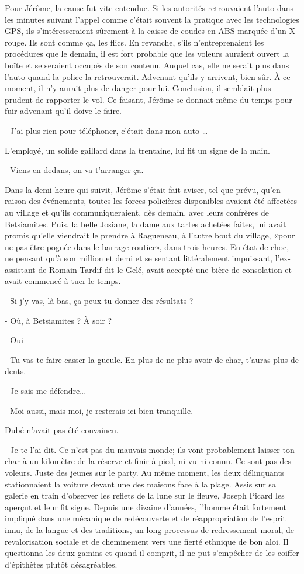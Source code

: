 Pour Jérôme, la cause fut vite entendue. Si les autorités retrouvaient l’auto dans les minutes suivant l’appel comme c’était souvent la pratique avec les technologies GPS, ils s’intéresseraient sûrement à la caisse de coudes en ABS marquée d’un X rouge. Ils sont comme ça, les flics. En revanche, s’ils n’entreprenaient les procédures que le demain, il est fort probable que les voleurs auraient ouvert la boîte et se seraient occupés de son contenu. Auquel cas, elle ne serait plus dans l’auto quand la police la retrouverait. Advenant qu’ils y arrivent, bien sûr. À ce moment, il n’y aurait plus de danger pour lui. Conclusion, il semblait plus prudent de rapporter le vol. Ce faisant, Jérôme se donnait même du temps pour fuir advenant qu’il doive le faire.

- J’ai plus rien pour téléphoner, c’était dans mon auto …

L’employé, un solide gaillard dans la trentaine, lui fit un signe de la main.

- Viens en dedans, on va t’arranger ça.

Dans la demi-heure qui suivit, Jérôme s’était fait aviser, tel que prévu, qu’en raison des événements, toutes les forces policières disponibles avaient été affectées au village et qu’ils communiqueraient, dès demain, avec leurs confrères de Betsiamites. Puis, la belle Josiane, la dame aux tartes achetées faites, lui avait promis qu’elle viendrait le prendre à Ragueneau, à l’autre bout du village, «pour ne pas être pognée dans le barrage routier», dans trois heures. En état de choc, ne pensant qu’à son million et demi et se sentant littéralement impuissant, l’ex-assistant de Romain Tardif dit le Gelé, avait accepté une bière de consolation et avait commencé à tuer le temps.

- Si j’y vas, là-bas, ça peux-tu donner des résultats ?

- Où, à Betsiamites ? À soir ?

- Oui

- Tu vas te faire casser la gueule. En plus de ne plus avoir de char, t’auras plus de dents.

- Je sais me défendre…

- Moi aussi, mais moi, je resterais ici bien tranquille.

Dubé n’avait pas été convaincu.

- Je te l’ai dit. Ce n’est pas du mauvais monde; ils vont probablement laisser ton char à un kilomètre de la réserve et finir à pied, ni vu ni connu. Ce sont pas des voleurs. Juste des jeunes sur le party.
Au même moment, les deux délinquants stationnaient la voiture devant une des maisons face à la plage. Assis sur sa galerie en train d’observer les reflets de la lune sur le fleuve, Joseph Picard les aperçut et leur fit signe. Depuis une dizaine d’années, l’homme était fortement impliqué dans une mécanique de redécouverte et de réappropriation de l’esprit innu, de la langue et des traditions, un long processus de redressement moral, de revalorisation sociale et de cheminement vers une fierté ethnique de bon aloi. Il questionna les deux gamins et quand il comprit, il ne put s’empêcher de les coiffer d’épithètes plutôt désagréables.

